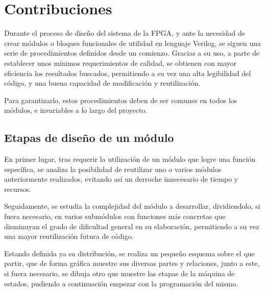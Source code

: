 \chapter{Contribuciones}
\label{ch:contribuciones}

Durante el proceso de diseño del sistema de la FPGA, y ante la necesidad de crear módulos o bloques funcionales de utilidad en lenguaje Verilog\cite{stuartsutherland2001}, se siguen una serie de procedimientos definidos desde un comienzo. Gracias a su uso, a parte de establecer unos mínimos requerimientos de calidad, se obtienen con mayor eficiencia los resultados buscados, permitiendo a su vez una alta legibilidad del código, y una buena capacidad de modificación y reutilización.

Para garantizarlo, estos procedimientos deben de ser comunes en todos los módulos, e invariables a lo largo del proyecto.



\section{Etapas de diseño de un módulo}
\label{ch:contribuciones:etapas}
En primer lugar, tras requerir la utilización de un módulo que logre una función específica, se analiza la posibilidad de reutilizar uno o varios módulos anteriormente realizados, evitando así un derroche innecesario de tiempo y recursos.

Seguidamente, se estudia la complejidad del módulo a desarrollar, dividiendolo, si fuera necesario, en varios submódulos con funciones más concretas que disminuyan el grado de dificultad general en su elaboración, permitiendo a su vez una mayor reutilización futura de código.

Estando definida ya su distribución, se realiza un pequeño esquema sobre el que partir, que de forma gráfica muestre sus diversas partes y relaciones, junto a este, si fuera necesario, se dibuja otro que muestre las etapas de la máquina de estados, pudiendo a continuación empezar con la programación del mismo.

